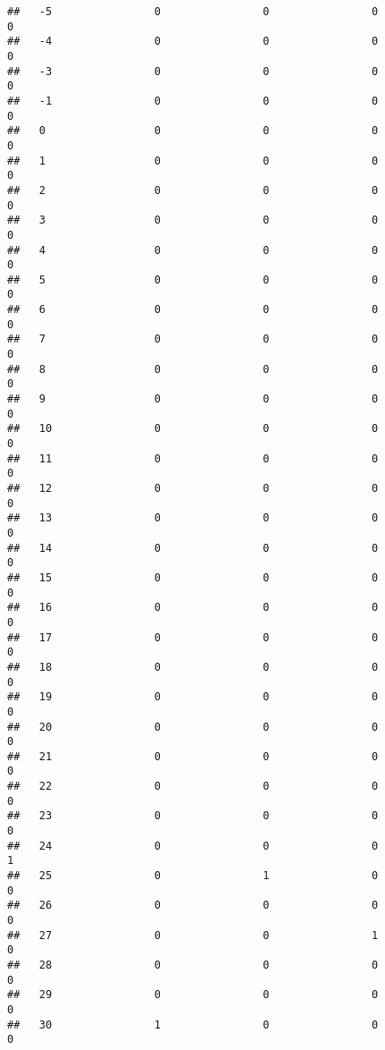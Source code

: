\documentclass[]{article}
\begin{document}
\begin{verbatim}
##   -5                0                0                0                0
##   -4                0                0                0                0
##   -3                0                0                0                0
##   -1                0                0                0                0
##   0                 0                0                0                0
##   1                 0                0                0                0
##   2                 0                0                0                0
##   3                 0                0                0                0
##   4                 0                0                0                0
##   5                 0                0                0                0
##   6                 0                0                0                0
##   7                 0                0                0                0
##   8                 0                0                0                0
##   9                 0                0                0                0
##   10                0                0                0                0
##   11                0                0                0                0
##   12                0                0                0                0
##   13                0                0                0                0
##   14                0                0                0                0
##   15                0                0                0                0
##   16                0                0                0                0
##   17                0                0                0                0
##   18                0                0                0                0
##   19                0                0                0                0
##   20                0                0                0                0
##   21                0                0                0                0
##   22                0                0                0                0
##   23                0                0                0                0
##   24                0                0                0                1
##   25                0                1                0                0
##   26                0                0                0                0
##   27                0                0                1                0
##   28                0                0                0                0
##   29                0                0                0                0
##   30                1                0                0                0

\end{verbatim}
\end{document}
